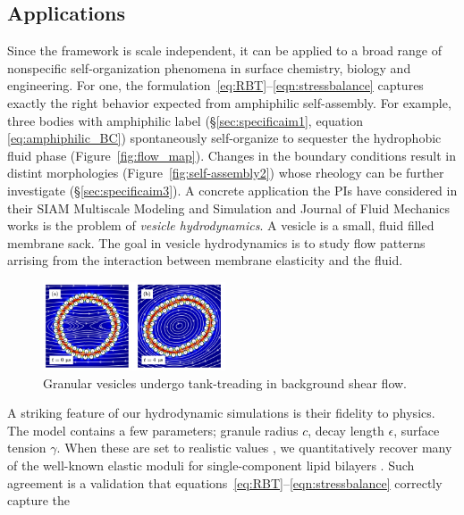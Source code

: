 \subsection{Applications}
Since the framework is scale independent, it can be applied to a broad range
of nonspecific self-organization phenomena in surface chemistry, biology
and engineering. For one, the
formulation~\eqref{eq:RBT}--\eqref{eqn:stressbalance} captures exactly
the right behavior expected from amphiphilic self-assembly. For example,
three bodies with amphiphilic label
(\S\ref{sec:specificaim1}, equation \eqref{eq:amphiphilic_BC})
spontaneously self-organize to sequester the hydrophobic fluid phase
(Figure~\ref{fig:flow_map}). Changes in the boundary conditions result
in distint morphologies (Figure~\ref{fig:self-assembly2}) whose rheology
can be further investigate (\S\ref{sec:specificaim3}).
%
A concrete application the PIs have considered in their
SIAM Multiscale Modeling and Simulation and Journal of Fluid Mechanics works
\cite{Fu2018_SIAM, FuQuRyYo22}
is the problem of \emph{vesicle hydrodynamics}.
A vesicle is a small, fluid filled membrane sack.
The goal in vesicle hydrodynamics is to study flow patterns 
arrising from the interaction
between membrane elasticity and the fluid.

\begin{figure}
\vspace{-5pt}
\includegraphics[width=0.48\textwidth]{figures/PreliminaryWork/TankTreading.jpg}
\vspace{-20pt}
\caption{\label{fig:JPv_linearshear} \footnotesize Granular vesicles
  undergo tank-treading in background shear flow.}
\end{figure}
%
A striking feature of our hydrodynamic
simulations is their fidelity to physics.
The model contains a few
parameters; granule radius $c$,
decay length $\epsilon$,
surface tension $\gamma$.
When these are set to realistic values 
\cite{Fu2018_SIAM, ErLjCl89, Lin2005, Parsegian, Israelachvili80, GarciaSaez, KUZMIN2005, Petelska2012,Jackson2016},
we quantitatively recover many of the well-known
elastic moduli for single-component lipid bilayers
\cite{Nagle17, Nagle17-2, LeVeWa14,NAGLE2000159}. 
Such agreement is a validation that equations~\eqref{eq:RBT}--\eqref{eqn:stressbalance} 
correctly capture the 


